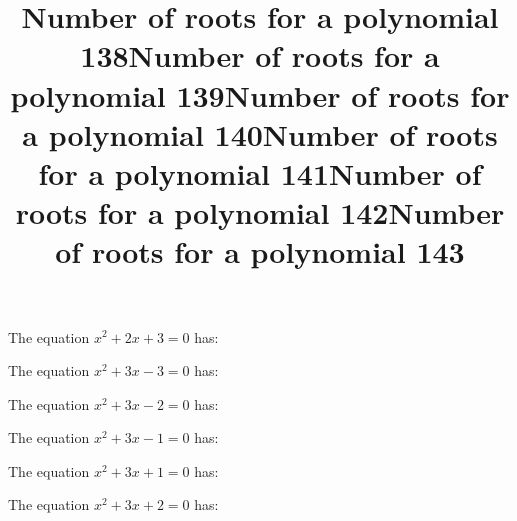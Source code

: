 \documentclass{article}
\begin{document}
\begin{category}
\begin{question}[multichoice]


\end{question}
\begin{question}[multichoice]
\title{Number of roots for a polynomial 138}
The equation $x^{2} + 2 x + 3=0$ has:



\end{question}
\begin{question}[multichoice]
\title{Number of roots for a polynomial 139}
The equation $x^{2} + 3 x - 3=0$ has:



\end{question}
\begin{question}[multichoice]
\title{Number of roots for a polynomial 140}
The equation $x^{2} + 3 x - 2=0$ has:



\end{question}
\begin{question}[multichoice]
\title{Number of roots for a polynomial 141}
The equation $x^{2} + 3 x - 1=0$ has:



\end{question}
\begin{question}[multichoice]
\title{Number of roots for a polynomial 142}
The equation $x^{2} + 3 x + 1=0$ has:



\end{question}
\begin{question}[multichoice]
\title{Number of roots for a polynomial 143}
The equation $x^{2} + 3 x + 2=0$ has:




\end{question}
\end{category}
\end{document}
